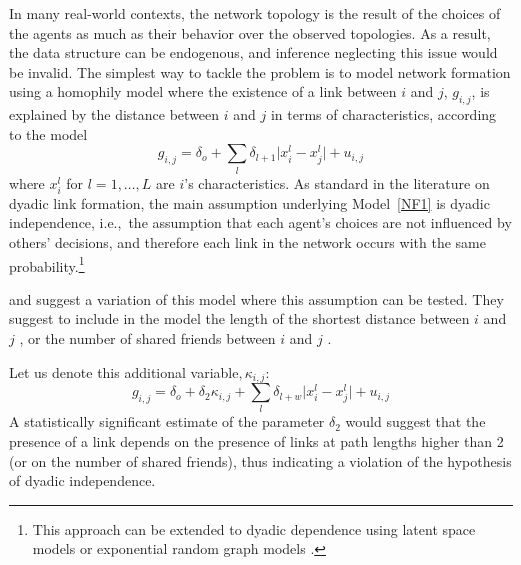 \documentclass[nojss]{jss}
\begin{document}
In many real-world contexts, the network topology is the result of the
choices of the agents as much as their behavior over the observed
topologies.  As a result, the data structure can be endogenous, and
inference neglecting this issue would be invalid.  The simplest way to
tackle the problem is to model network formation using a homophily model
\cite[see
e.g.,][]{Fafchamps+Gubert:2007,Mayer+Puller:2008,Lai+Reiter:2017,Apicella+Marlowe+Fowler+Christakis:2012,Attanasio+Barr+Cardenas+Genicot+Meghir:2012}
where the existence of a link between $i$ and $j$, $g_{i,j}$, is explained
by the distance between $i$ and $j$ in terms of characteristics, according
to the model
%
\begin{equation}
g_{i,j}=\delta _{o}+\sum_{l}\delta _{l+1}\lvert x_{i}^{l}-x_{j}^{l}\rvert+u_{i,j}
\label{NF1}
\end{equation}
%
where $x_{i}^{l}$ for $l=1,\dots, L$ are $i$'s characteristics.  As standard in
the literature on dyadic link formation, the main assumption underlying
Model~\ref{NF1} is dyadic independence, i.e.,~the assumption that each
agent's choices are not influenced by others' decisions, and therefore each
link in the network occurs with the same probability.\footnote{This
approach can be extended to dyadic dependence using latent space models or
exponential random graph models \citep[see][for a discussion]{An:2011}.}

\cite{Fafchamps+Leij+Goyal:2010} and \cite{Graham:2015} suggest a variation
of this model where this assumption can be tested.  They suggest to include
in the model the length of the shortest distance between $i$ and $j$
\citep{Fafchamps+Leij+Goyal:2010}, or the number of shared friends between
$i$ and $j$ \citep{Graham:2015}.

Let us denote this additional variable$, \kappa _{i,j}$:
%
\begin{equation}
g_{i,j}=\delta _{o}+\delta _{2}\kappa _{i,j}+\sum_{l}\delta
_{l+w}\lvert x_{i}^{l}-x_{j}^{l}\rvert +u_{i,j}  
\label{NF2}
\end{equation}
%
A statistically significant estimate of the parameter $\delta _{2}$ would
suggest that the presence of a link depends on the presence of links at path
lengths higher than 2 (or on the number of shared friends), thus indicating
a violation of the hypothesis of dyadic independence.
\end{document}
